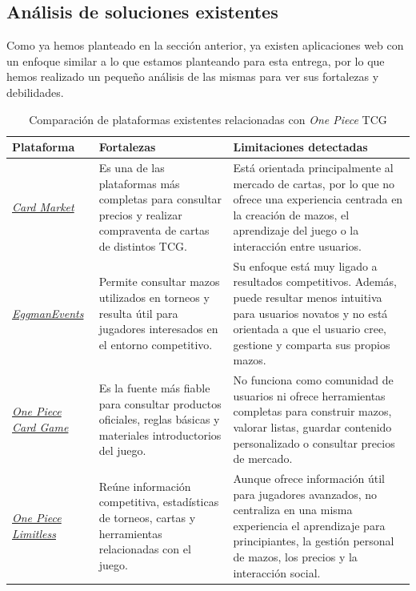\documentclass[10pt]{article}
\begin{document}
	\subsection{Análisis de soluciones existentes}   \label{ASE}
	Como ya hemos planteado en la sección anterior, ya existen aplicaciones web con un enfoque similar a lo que estamos planteando para esta entrega, por lo que hemos realizado un pequeño análisis de las mismas para ver sus fortalezas y debilidades.
	\begin{table}[H]
		\centering
		\renewcommand{\arraystretch}{1.3}
		\begin{tabular}{|p{3.2cm}|p{5.2cm}|p{5.2cm}|}
			\hline
			\textbf{Plataforma} & \textbf{Fortalezas} & \textbf{Limitaciones detectadas} \\
			\hline
			\href{https://www.cardmarket.com/es/OnePiece}{\textit{Card Market}} & Es una de las plataformas más completas para consultar precios y realizar compraventa de cartas de distintos TCG. & Está orientada principalmente al mercado de cartas, por lo que no ofrece una experiencia centrada en la creación de mazos, el aprendizaje del juego o la interacción entre usuarios. \\
			\hline
			\href{https://deckbuilder.egmanevents.com/optcg/cards}{\textit{EggmanEvents}} & Permite consultar mazos utilizados en torneos y resulta útil para jugadores interesados en el entorno competitivo. & Su enfoque está muy ligado a resultados competitivos. Además, puede resultar menos intuitiva para usuarios novatos y no está orientada a que el usuario cree, gestione y comparta sus propios mazos. \\
			\hline
			\href{https://en.onepiece-cardgame.com/beginners/}{\textit{One Piece Card Game}} & Es la fuente más fiable para consultar productos oficiales, reglas básicas y materiales introductorios del juego. & No funciona como comunidad de usuarios ni ofrece herramientas completas para construir mazos, valorar listas, guardar contenido personalizado o consultar precios de mercado. \\
			\hline
			
			\href{https://onepiece.limitlesstcg.com}{\textit{One Piece Limitless}} & Reúne información competitiva, estadísticas de torneos, cartas y herramientas relacionadas con el juego. & Aunque ofrece información útil para jugadores avanzados, no centraliza en una misma experiencia el aprendizaje para principiantes, la gestión personal de mazos, los precios y la interacción social. \\
			\hline
		\end{tabular}
		\caption{Comparación de plataformas existentes relacionadas con \textit{One Piece} TCG}
	\end{table}     
	\newpage
\end{document}
